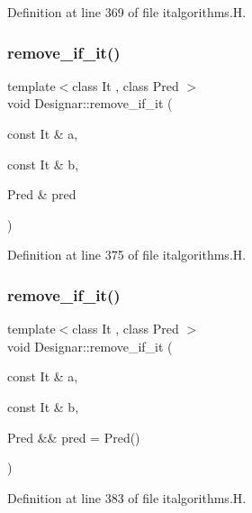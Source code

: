 Definition at line 369 of file italgorithms.\+H.

\mbox{\label{namespace_designar_a4d9b53ca57cf3e6a1baf14e495c974a7}} 
\subsubsection{\texorpdfstring{remove\+\_\+if\+\_\+it()}{remove\_if\_it()}\hspace{0.1cm}{\footnotesize\ttfamily [1/2]}}
{\footnotesize\ttfamily template$<$class It , class Pred $>$ \\
void Designar\+::remove\+\_\+if\+\_\+it (\begin{DoxyParamCaption}\item[{const It \&}]{a,  }\item[{const It \&}]{b,  }\item[{Pred \&}]{pred }\end{DoxyParamCaption})}



Definition at line 375 of file italgorithms.\+H.

\mbox{\label{namespace_designar_afe463efc1ccacf9b22f6e5ea0619b2ac}} 
\subsubsection{\texorpdfstring{remove\+\_\+if\+\_\+it()}{remove\_if\_it()}\hspace{0.1cm}{\footnotesize\ttfamily [2/2]}}
{\footnotesize\ttfamily template$<$class It , class Pred $>$ \\
void Designar\+::remove\+\_\+if\+\_\+it (\begin{DoxyParamCaption}\item[{const It \&}]{a,  }\item[{const It \&}]{b,  }\item[{Pred \&\&}]{pred = {\ttfamily Pred()} }\end{DoxyParamCaption})}



Definition at line 383 of file italgorithms.\+H.

